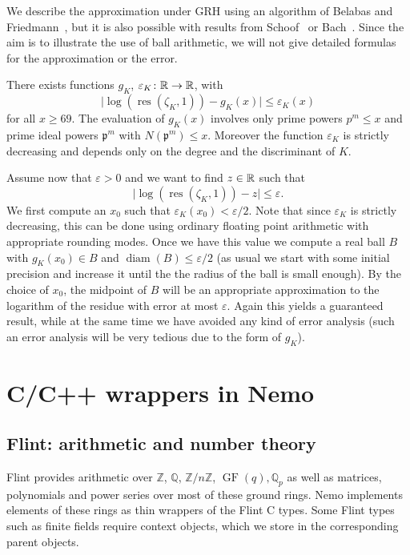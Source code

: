 \documentclass{sig-alternate-05-2015}
\begin{document}
We describe the approximation under GRH using an algorithm of Belabas and Friedmann~\cite{Belabas2015}, but it is also possible with results from Schoof~\cite{Schoof1982} or Bach~\cite{Bach1995}.
Since the aim is to illustrate the use of ball arithmetic, we will not give detailed formulas for the approximation or the error.

\begin{theorem}
There exists functions $g_K$, $\varepsilon_K \colon \mathbb{R} \to \mathbb{R}$, with
\[ \lvert \log(\operatorname{res}(\zeta_K, 1)) - g_K(x) \rvert \leq \varepsilon_K(x) \]
for all $x \geq 69$. The evaluation of $g_K(x)$ involves only prime powers $p^m \leq x$ and prime ideal powers $\mathfrak p^m$ with $N(\mathfrak p^m) \leq x$.
Moreover the function $\varepsilon_K$ is strictly decreasing and depends only on the degree and the discriminant of $K$.
\end{theorem}

Assume now that $\varepsilon > 0$ and we want to find $z \in \mathbb{R}$ such that
\[ \lvert \log(\operatorname{res}(\zeta_K, 1)) - z \rvert \leq \varepsilon.\]
We first compute an $x_0$ such that $\varepsilon_K(x_0) < \varepsilon/2$. Note that since $\varepsilon_K$ is strictly decreasing, this can be done using ordinary floating point arithmetic with appropriate rounding modes.
Once we have this value we compute a real ball $B$ with $g_K(x_0) \in B$ and $\operatorname{diam}(B) \leq \varepsilon/2$ (as usual we start with some initial precision and increase it until the the radius of the ball is small enough).
By the choice of $x_0$, the midpoint of $B$ will be an appropriate approximation to the logarithm of the residue with error at most $\varepsilon$.
Again this yields a guaranteed result, while at the same time we have avoided any kind of error analysis (such an error analysis will be very tedious due to the form of $g_K$).

\section{C/C++ wrappers in Nemo}

\subsection{Flint: arithmetic and number theory}

Flint provides arithmetic over
$\mathbb{Z}$, $\mathbb{Q}$, $\mathbb{Z}/n\mathbb{Z}$,
$\operatorname{GF}(q), \mathbb{Q}_p$
as well as matrices, polynomials and power series over most
of these ground rings.
Nemo implements elements of these rings as thin wrappers of the
Flint C types.
Some Flint types such as finite fields
require context objects, which we
store in the corresponding parent objects.
\end{document}
